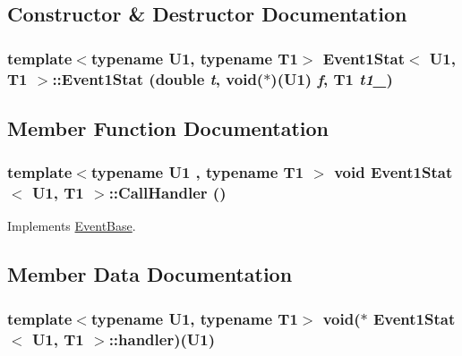 \subsection{Constructor \& Destructor Documentation}
\hypertarget{classEvent1Stat_18fbb4bda5eec5c76b184c1905e6a51b}{
\subsubsection[{Event1Stat}]{\setlength{\rightskip}{0pt plus 5cm}template$<$typename U1, typename T1$>$ {\bf Event1Stat}$<$ U1, T1 $>$::{\bf Event1Stat} (double {\em t}, \/  void($\ast$)(U1) {\em f}, \/  T1 {\em t1\_})}}
\label{classEvent1Stat_18fbb4bda5eec5c76b184c1905e6a51b}




\subsection{Member Function Documentation}
\hypertarget{classEvent1Stat_d39942fb840e55ee829decdf1927eadf}{
\subsubsection[{CallHandler}]{\setlength{\rightskip}{0pt plus 5cm}template$<$typename U1 , typename T1 $>$ void {\bf Event1Stat}$<$ U1, T1 $>$::CallHandler ()}}
\label{classEvent1Stat_d39942fb840e55ee829decdf1927eadf}




Implements \hyperlink{classEventBase_121ca64dec88c8d9589c064b0060d037}{EventBase}.

\subsection{Member Data Documentation}
\hypertarget{classEvent1Stat_d5c1915ba5261468e90f35d2e4200af7}{
\subsubsection[{handler}]{\setlength{\rightskip}{0pt plus 5cm}template$<$typename U1, typename T1$>$ void($\ast$ {\bf Event1Stat}$<$ U1, T1 $>$::{\bf handler})(U1)}}
\label{classEvent1Stat_d5c1915ba5261468e90f35d2e4200af7}


